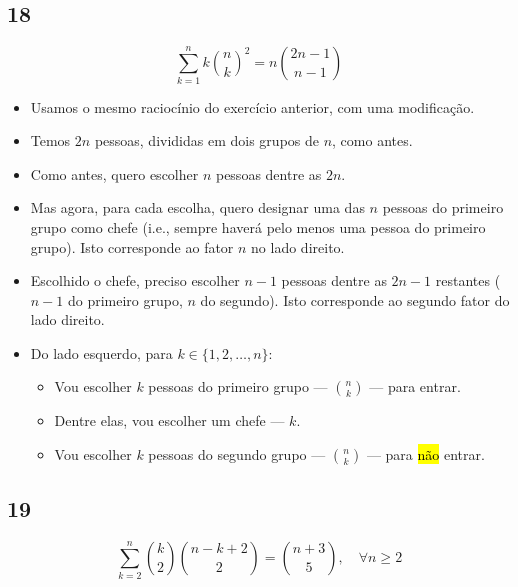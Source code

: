 \documentclass[
  11pt]{report}
\begin{document}
\hypertarget{section-1}{%
\subsection*{18}\label{section-1}}

\begin{rmdbox}
\[
\sum_{k = 1}^n k\binom{n}{k}^2 = n\binom{2n-1}{n-1}
\]

\end{rmdbox}

\begin{itemize}
\item
  Usamos o mesmo raciocínio do exercício anterior, com uma modificação.
\item
  Temos $2n$ pessoas, divididas em dois grupos de $n$, como antes.
\item
  Como antes, quero escolher $n$ pessoas dentre as $2n$.
\item
  Mas agora, para cada escolha, quero designar uma das $n$ pessoas do primeiro grupo como chefe (i.e., sempre haverá pelo menos uma pessoa do primeiro grupo). Isto corresponde ao fator $n$ no lado direito.
\item
  Escolhido o chefe, preciso escolher $n - 1$ pessoas dentre as $2n - 1$ restantes ($n - 1$ do primeiro grupo, $n$ do segundo). Isto corresponde ao segundo fator do lado direito.
\item
  Do lado esquerdo, para $k \in \{1, 2, \ldots, n \}$:

  \begin{itemize}
  \item
    Vou escolher $k$ pessoas do primeiro grupo --- $\binom{n}{k}$ --- para entrar.
  \item
    Dentre elas, vou escolher um chefe --- $k$.
  \item
    Vou escolher $k$ pessoas do segundo grupo --- $\binom{n}{k}$ --- para {\hl{não}} entrar.
  \end{itemize}
\end{itemize}

\hypertarget{section-2}{%
\subsection*{19}\label{section-2}}

\begin{rmdbox}
\[
\sum_{k=2}^n \binom k2 \binom{n-k+2}{2} = \binom{n+3}{5}, \quad \forall n \geq 2
\]

\end{rmdbox}
\end{document}
